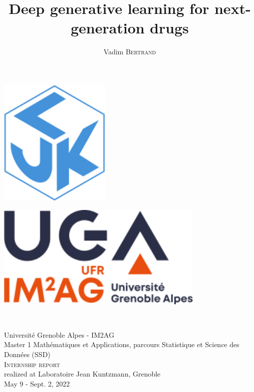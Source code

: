\documentclass{article}
\title{Deep generative learning for next-generation drugs}
\author{Vadim \textsc{Bertrand}}
\date{}
\begin{document}
\begin{titlepage}
	\begin{minipage}{0.5\textwidth}
		\begin{flushleft}
		    \includegraphics[width=0.4\textwidth]{logo_ljk.png}
		\end{flushleft}
	\end{minipage}
	\begin{minipage}{0.5\textwidth}
        \begin{flushright}
            \includegraphics[width=0.75\textwidth]{logo_im2ag.png}
		\end{flushright}
	\end{minipage}\\[1.5 cm]
	
    \begin{center}
        {\Large Université Grenoble Alpes - IM2AG\\[.5 cm]
        Master 1 Mathématiques et Applications, parcours Statistique et Science des Données (SSD)}\\[1.5 cm]
        
        \textsc{\LARGE Internship report}
        \\[.5 cm]
        \large realized at Laboratoire Jean Kuntzmann, Grenoble\\[.2 cm]
        May 9 - Sept. 2, 2022\\[1.5 cm]
	    

\end{center}
\end{titlepage}
\end{document}
